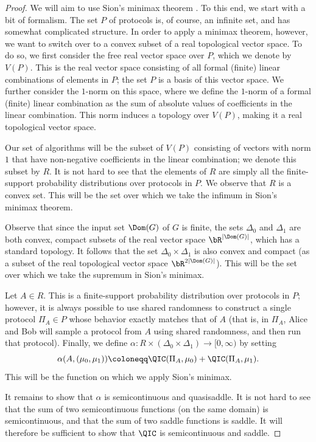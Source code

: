 \begin{proof}
We will aim to use Sion's minimax theorem \cite{Sio58}.
To this end, we start with a bit of formalism.
The set $P$ of protocols is, of course, an infinite set,
and has somewhat complicated structure.
In order to apply a minimax theorem, however, we want
to switch over to a convex subset of a real topological
vector space. To do so, we first consider the
free real vector space over $P$, which we denote
by $V(P)$. This is the real vector space consisting
of all formal (finite) linear combinations of elements in $P$;
the set $P$ is a basis of this vector space. We further
consider the $1$-norm on this space, where we define
the $1$-norm of a formal (finite) linear combination
as the sum of absolute values of coefficients in the linear
combination. This norm induces a topology over $V(P)$,
making it a real topological vector space.

Our set of algorithms will be the subset of $V(P)$
consisting of vectors with norm $1$ that have
non-negative coefficients in the linear combination; we denote this
subset by $R$. It is not hard to see that the elements of $R$
are simply all the finite-support probability distributions
over protocols in $P$. We observe that $R$ is a convex set.
This will be the set over which we take the infimum in Sion's
minimax theorem.

Observe that since the input set $\Dom(G)$ of $G$ is finite,
the sets $\Delta_0$ and $\Delta_1$ are both convex, compact
subsets of the real vector space $\bR^{|\Dom(G)|}$, which
has a standard topology. It follows that the
set $\Delta_0\times\Delta_1$ is also convex and compact
(as a subset of the real topological vector space
$\bR^{2|\Dom(G)|}$). This will be the set over which we take the
supremum in Sion's minimax.

Let $A\in R$. This is a finite-support probability
distribution over protocols in $P$; however, it is always
possible to use shared randomness to construct a single
protocol $\Pi_A\in P$ whose behavior exactly matches
that of $A$ (that is, in $\Pi_A$, Alice and Bob will
sample a protocol from $A$ using shared randomness,
and then run that protocol).
Finally, we define
$\alpha\colon R\times(\Delta_0\times\Delta_1)\to[0,\infty)$
by setting
\[\alpha(A,(\mu_0,\mu_1))\coloneqq 
\QIC(\Pi_A,\mu_0)+\QIC(\Pi_A,\mu_1).\]
This will be the function on which we apply Sion's minimax.

It remains to show that $\alpha$ is semicontinuous and
quasisaddle. It is not hard to see that the sum of two
semicontinuous functions (on the same domain) is semicontinuous,
and that the sum of two saddle functions is saddle.
It will therefore be sufficient to show that $\QIC$
is semicontinuous and saddle.


\end{proof}
